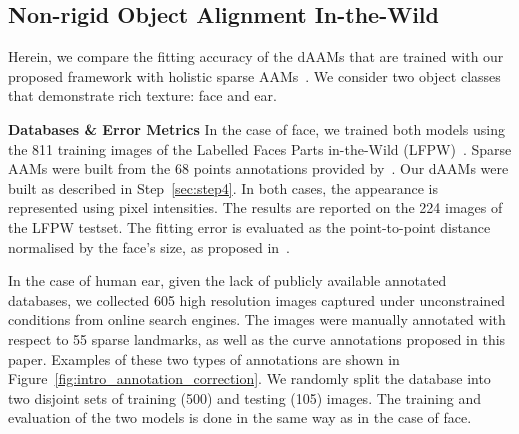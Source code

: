 \subsection{Non-rigid Object Alignment In-the-Wild}
\label{exp:daam_benchmark}
Herein, we compare the fitting accuracy of the dAAMs that are trained with our proposed framework with holistic sparse AAMs~\cite{Cootes2001,Matthews2004,antonakos2015feature}. We consider two object classes that demonstrate rich texture: face and ear.

\noindent\textbf{Databases \& Error Metrics} In the case of face, we trained both models using the 811 training images of the Labelled Faces Parts in-the-Wild (LFPW)~\cite{belhumeur2013localizing}. Sparse AAMs were built from the 68 points annotations provided by~\cite{sagonas_iccv_300w_2013,sagonas2016faces}. Our dAAMs were built as described in Step~\ref{sec:step4}. In both cases, the appearance is represented using pixel intensities. The results are reported on the 224 images of the LFPW testset. The fitting error is evaluated as the point-to-point distance normalised by the face's size, as proposed in~\cite{Zhu2012}.

In the case of human ear, given the lack of publicly available annotated databases, we collected 605 high resolution images captured under unconstrained conditions from online search engines. The images were manually annotated with respect to 55 sparse landmarks, as well as the curve annotations proposed in this paper. Examples of these two types of annotations are shown in Figure~\ref{fig:intro_annotation_correction}. We randomly split the database into two disjoint sets of training (500) and testing (105) images. The training and evaluation of the two models is done in the same way as in the case of face.

